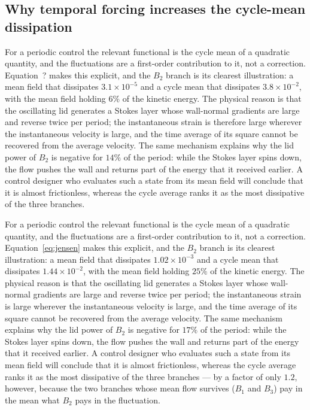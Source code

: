\documentclass[11pt,a4paper]{article}
\newenvironment{chgadd}{\par\color{blue}}{\par\color{black}}
\newenvironment{chgdel}{\par\color{red}}{\par\color{black}}
\begin{document}
\subsection{Why temporal forcing increases the cycle-mean dissipation}

\begin{chgdel}
For a periodic control the relevant functional is the cycle mean of a quadratic
quantity, and the fluctuations are a first-order contribution to it, not a
correction. Equation~? makes this explicit, and the $B_2$ branch
is its clearest illustration: a mean field that dissipates $3.1\times10^{-5}$ and
a cycle mean that dissipates $3.8\times10^{-2}$, with the mean field holding $6\%$
of the kinetic energy. The physical reason is that the oscillating lid generates a
Stokes layer whose wall-normal gradients are large and reverse twice per period;
the instantaneous strain is therefore large wherever the instantaneous velocity
is large, and the time average of its square cannot be recovered from the average
velocity. The same mechanism explains why the lid power of $B_2$ is negative for
$14\%$ of the period: while the Stokes layer spins down, the flow pushes the wall
and returns part of the energy that it received earlier. A control designer who
evaluates such a state from its mean field will conclude that it is almost
frictionless, whereas the cycle average ranks it as the most dissipative of the
three branches.
\end{chgdel}

\begin{chgadd}
For a periodic control the relevant functional is the cycle mean of a quadratic
quantity, and the fluctuations are a first-order contribution to it, not a
correction. Equation~\eqref{eq:jensen} makes this explicit, and the $B_2$ branch
is its clearest illustration: a mean field that dissipates $1.02\times10^{-3}$ and
a cycle mean that dissipates $1.44\times10^{-2}$, with the mean field holding $25\%$
of the kinetic energy. The physical reason is that the oscillating lid generates a
Stokes layer whose wall-normal gradients are large and reverse twice per period;
the instantaneous strain is large wherever the instantaneous velocity
is large, and the time average of its square cannot be recovered from the average
velocity. The same mechanism explains why the lid power of $B_2$ is negative for
$17\%$ of the period: while the Stokes layer spins down, the flow pushes the wall
and returns part of the energy that it received earlier. A control designer who
evaluates such a state from its mean field will conclude that it is almost
frictionless, whereas the cycle average ranks it as the most dissipative of the
three branches --- by a factor of only $1.2$, however, because the two branches
whose mean flow survives ($B_1$ and $B_3$) pay in the mean what $B_2$ pays in the
fluctuation.
\end{chgadd}
\end{document}
